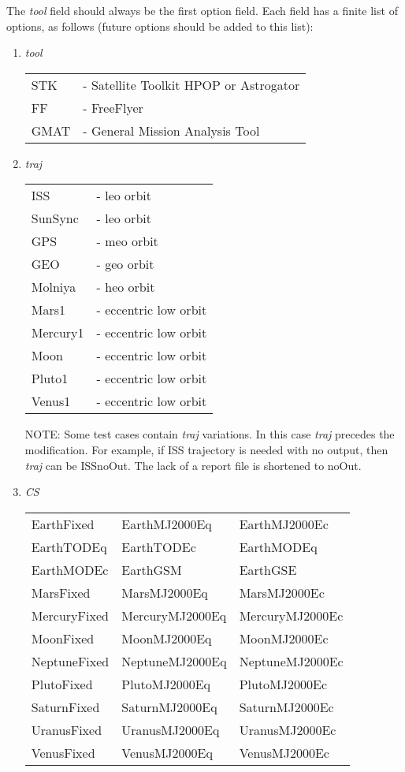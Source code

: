 The \emph{tool} field should always be the first option field. Each
field has a finite list of options, as follows (future options
should be added to this list):
\begin{enumerate}
  \item \emph{tool}\\
  \begin{tabular}{ll}
    STK  & - Satellite Toolkit HPOP or Astrogator\\
    FF   & - FreeFlyer\\
    GMAT & - General Mission Analysis Tool\\
  \end{tabular}

  \item \emph{traj}\\
  \begin{tabular}{ll}
    ISS & - leo orbit\\
    SunSync & - leo orbit\\
    GPS & - meo orbit\\
    GEO & - geo orbit\\
    Molniya & - heo orbit\\
    Mars1 & - eccentric low orbit\\
    Mercury1 & - eccentric low orbit\\
    Moon & - eccentric low orbit\\
    Pluto1 & - eccentric low orbit\\
    Venus1 & - eccentric low orbit\\
  \end{tabular}

NOTE:  Some test cases contain \emph{traj} variations. In this case
\emph{traj} precedes the modification. For example, if ISS
trajectory is needed with no output, then \emph{traj} can be
ISSnoOut. The lack of a report file is shortened to noOut.

  \item \emph{CS}\\
  \begin{tabular}{lll}
    EarthFixed & EarthMJ2000Eq & EarthMJ2000Ec\\
    EarthTODEq & EarthTODEc & EarthMODEq\\
    EarthMODEc & EarthGSM & EarthGSE\\
    MarsFixed & MarsMJ2000Eq & MarsMJ2000Ec\\
    MercuryFixed & MercuryMJ2000Eq & MercuryMJ2000Ec\\
    MoonFixed & MoonMJ2000Eq & MoonMJ2000Ec\\
    NeptuneFixed & NeptuneMJ2000Eq & NeptuneMJ2000Ec\\
    PlutoFixed & PlutoMJ2000Eq & PlutoMJ2000Ec\\
    SaturnFixed & SaturnMJ2000Eq & SaturnMJ2000Ec\\
    UranusFixed & UranusMJ2000Eq & UranusMJ2000Ec\\
    VenusFixed & VenusMJ2000Eq & VenusMJ2000Ec\\
  \end{tabular}

\end{enumerate}
